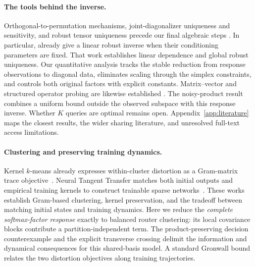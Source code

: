 \paragraph{The tools behind the inverse.}
Orthogonal-to-permutation mechanisms, joint-diagonalizer uniqueness and
sensitivity, and robust tensor uniqueness precede our final algebraic steps
\citep{dorrell2026convex,afsari2008sensitivity,bhaskara2014uniqueness}.
In particular, \citet[Thm.~5]{bhaskara2014uniqueness} already give a linear
robust inverse when their conditioning parameters are fixed. That work establishes linear dependence and global robust uniqueness.
Our quantitative analysis tracks the stable reduction from response observations to diagonal data,
eliminates scaling through the simplex constraints, and controls both
original factors with explicit constants. Matrix--vector and structured
operator probing are likewise established
\citep{novak2022fast,chiu2012matrix,halikias2024structured,amsel2026query}.
The noisy-product result combines a uniform bound outside the observed
subspace with this response inverse. Whether $K$ queries are optimal remains open.
Appendix~\ref{app:literature} maps the closest results, the wider sharing
literature, and unresolved full-text access limitations.


\paragraph{Clustering and preserving training dynamics.}
Kernel $k$-means already expresses within-cluster distortion as a
Gram-matrix trace objective~\citep{dhillon2004kernel}.
Neural Tangent Transfer matches both initial outputs and empirical training
kernels to construct trainable sparse networks~\citep{pmlr-v119-liu20o}.
These works establish Gram-based clustering, kernel preservation, and
the tradeoff between matching initial states and training dynamics. Here
we reduce the \emph{complete softmax-factor response} exactly to balanced
router clustering: its local covariance blocks contribute a partition-independent
term. The product-preserving decision counterexample and the explicit
transverse crossing delimit the information and dynamical consequences for
this shared-basis model. A standard Gronwall bound relates the two distortion objectives along
training trajectories.
